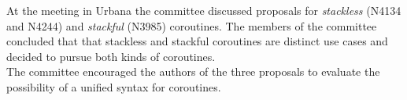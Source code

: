 At the meeting in Urbana the committee discussed proposals for \emph{stackless}
(N4134\cite{N4134} and N4244\cite{N4244}) and \emph{stackful}
(N3985\cite{N3985}) coroutines. The members of the committee concluded that that
stackless and stackful coroutines are distinct use cases and decided to pursue
both kinds of coroutines.\\
The committee encouraged the authors of the three proposals to evaluate the
possibility of a unified syntax for coroutines.
